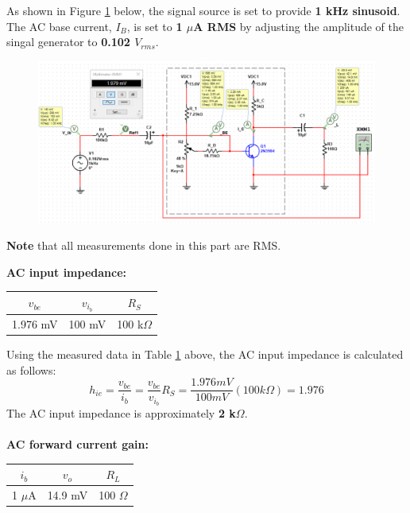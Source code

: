 \documentclass{article}
\begin{document}
	\noindent As shown in Figure \ref{f26} below, the signal source is set to provide \textbf{1 kHz sinusoid}.
	The AC base current, $I_B$, is set to \textbf{1 $\mu$A RMS} by adjusting the amplitude of the singal generator to \textbf{0.102 $V_{rms}$}.
	\begin{figure}[!ht]
		\centering
		\includegraphics[width=\linewidth]{part4-c-results.png}
		\label{f26}
	\end{figure}
	
	\noindent \textbf{Note} that all measurements done in this part are RMS.
	
	\pagebreak	
	\noindent\textbf{AC input impedance:}
	\begin{table}[!ht]
		\centering
		\label{t7}
		\begin{tabular}{|c|c|c|}
			\hline
			$v_{be}$ & $v_{i_{b}}$ & $R_S$\\
			\hline\hline
			1.976 mV & 100 mV & 100 k$\Omega$\\
			\hline
		\end{tabular}
	\end{table}

	\noindent Using the measured data in Table \ref{t7} above, the AC input impedance is calculated as follows:
	$$h_{ie} = \frac{v_{be}}{i_b} = \frac{v_{be}}{v_{i_{b}}}R_S = \frac{1.976 mV}{100 mV} (100 k\Omega) = 1.976$$
	The AC input impedance is approximately \textbf{2 k$\Omega$}.\\\\
	
	\noindent\textbf{AC forward current gain:}
	\begin{table}[!ht]
		\centering
		\label{t8}
		\begin{tabular}{|c|c|c|}
			\hline
			$i_b$ & $v_o$ & $R_L$\\
			\hline\hline
			1 $\mu$A & 14.9 mV & 100 $\Omega$\\
			\hline
		\end{tabular}
	\end{table}
	
\end{document}

